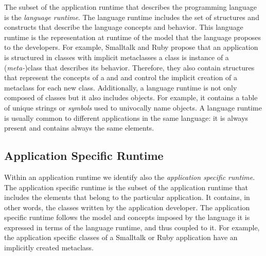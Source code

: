 The subset of the application runtime that describes the programming language is the \emph{language runtime}. The language runtime includes the set of structures and constructs that describe the language concepts and behavior. This language runtime is the representation at runtime of the model that the language proposes to the developers. For example, Smalltalk and Ruby propose that an application is structured in classes with implicit metaclasses \ie a class is instance of a (\emph{meta-})class that describes its behavior. Therefore, they also contain structures that represent the concepts of a  and  and control the implicit creation of a metaclass for each new class. Additionally, a language runtime is not only composed of classes but it also includes objects. For example, it contains a table of unique strings or \emph{symbols} used to univocally name objects. A language runtime is usually common to different applications in the same language: it is always present and contains always the same elements.

\subsection{Application Specific Runtime}

Within an application runtime we identify also the \emph{application specific runtime}. The application specific runtime is the subset of the application runtime that includes the elements that belong to the particular application. It contains, in other words, the classes written by the application developer. The application specific runtime follows the model and concepts imposed by the language \ie it is expressed in terms of the language runtime, and thus coupled to it. For example, the application specific classes of a Smalltalk or Ruby application have an implicitly created metaclass.

